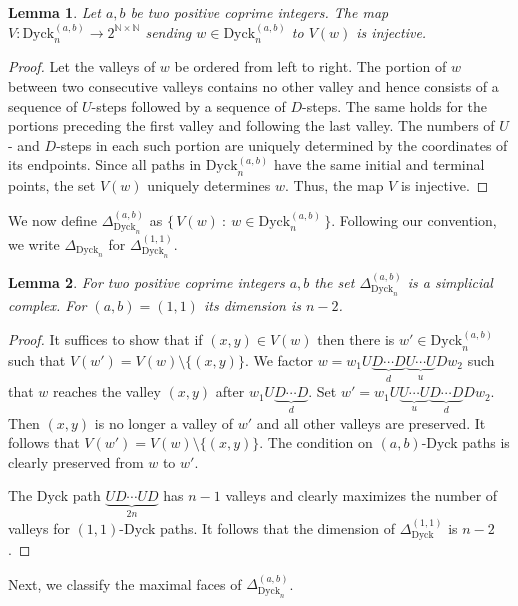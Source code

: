 \documentclass[11pt]{amsart}
\def\NN{\mathbb{N}}
\def\Dyck{\mathrm{Dyck}}
\theoremstyle{plain}
\newtheorem{lemma}{Lemma}
\numberwithin{lemma}{\DefaultNumberTheoremWithin}
\numberwithin{theorem}{\DefaultNumberTheoremWithin}
\numberwithin{corollary}{\DefaultNumberTheoremWithin}
\numberwithin{proposition}{\DefaultNumberTheoremWithin}
\numberwithin{conjecture}{\DefaultNumberTheoremWithin}
\theoremstyle{definition}
\numberwithin{definition}{\DefaultNumberTheoremWithin}
\numberwithin{question}{\DefaultNumberTheoremWithin}
\numberwithin{problem}{\DefaultNumberTheoremWithin}
\theoremstyle{remark}
\numberwithin{remark}{\DefaultNumberTheoremWithin}
\numberwithin{example}{\DefaultNumberTheoremWithin}
\numberwithin{claim}{\DefaultNumberTheoremWithin}
\begin{document}
\begin{lemma}
    Let $a,b$ be two positive coprime integers. 
    The map $V : \Dyck_n^{(a,b)} \rightarrow 2^{\NN \times \NN}$ sending $w \in \Dyck_n^{(a,b)}$ to $V(w)$  is injective. 
\end{lemma}

\begin{proof}
Let the valleys of $w$ be ordered from left to right. The portion
of $w$ between two consecutive valleys contains no other valley
and hence consists of a sequence of $U$-steps followed by a
sequence of $D$-steps. The same holds for the portions preceding
the first valley and following the last valley. The numbers of
$U$- and $D$-steps in each such portion are uniquely determined
by the coordinates of its endpoints. Since all paths in
$\Dyck_n^{(a,b)}$ have the same initial and terminal points, the
set $V(w)$ uniquely determines $w$. Thus, the map $V$ is
injective.
\end{proof}

We now define $\Delta_{\Dyck_n}^{(a,b)}$ as $\{ \,V(w)~:~w \in \Dyck_n^{(a,b)}\,\}$.
Following our convention, we write $\Delta_{\Dyck_n}$ for $\Delta_{\Dyck_n}^{(1,1)}$.

\begin{lemma}
    For two positive coprime integers $a,b$ the set $\Delta_{\Dyck_n}^{(a,b)}$ is a simplicial complex. 
    For $(a,b) = (1,1)$ its dimension is $n-2$.
\end{lemma}
\begin{proof}
    It suffices to show that if $(x,y) \in V(w)$ then there is
    $w' \in \Dyck_n^{(a,b)}$ such that $V(w') = V(w) \setminus \{(x,y)\}$. 
    We factor $w = w_1U\underbrace{D \cdots D}_d \underbrace{U\cdots U}_u D w_2$ such that $w$ reaches the valley $(x,y)$ after
        $w_1U\underbrace{D \cdots D}_d$. Set
        $w' = w_1U \underbrace{U\cdots U}_u \underbrace{D \cdots D}_d Dw_2$. Then $(x,y)$ is no longer a valley of $w'$ and all
        other valleys are preserved. It follows that 
        $V(w') = V(w) \setminus \{(x,y)\}$. The condition on $(a,b)$-Dyck paths is clearly preserved from $w$ to $w'$.

        The Dyck path
        $\underbrace{UD \cdots UD}_{2n}$
        has $n-1$ valleys and clearly
        maximizes the number of valleys
        for $(1,1)$-Dyck paths. It follows that
        the dimension of 
        $\Delta_\Dyck^{(1,1)}$ is $n-2$.
\end{proof}


Next, we classify the maximal faces of 
$\Delta_{\Dyck_n}^{(a,b)}$.
\end{document}
